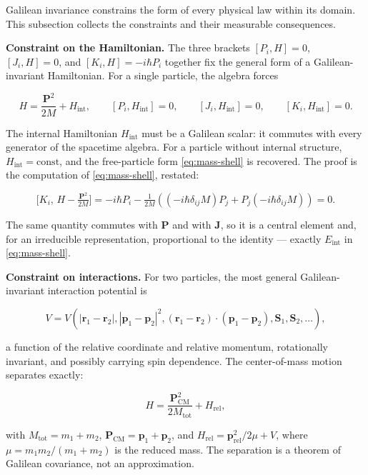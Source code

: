 Galilean invariance constrains the form of every physical law within its domain. This subsection collects the constraints and their measurable consequences.

\medskip\noindent\textbf{Constraint on the Hamiltonian.} The three brackets $[P_i,H]=0$, $[J_i,H]=0$, and $[K_i,H]=-i\hbar P_i$ together fix the general form of a Galilean-invariant Hamiltonian. For a single particle, the algebra forces
\begin{linenomath}
\begin{equation}
H = \frac{\bm P^{2}}{2M} + H_{\mathrm{int}},
\qquad
[P_i,H_{\mathrm{int}}] = 0,\qquad [J_i,H_{\mathrm{int}}] = 0,\qquad [K_i,H_{\mathrm{int}}] = 0.
\label{eq:constrained-hamiltonian}
\end{equation}
\end{linenomath}
The internal Hamiltonian $H_{\mathrm{int}}$ must be a Galilean scalar: it commutes with every generator of the spacetime algebra. For a particle without internal structure, $H_{\mathrm{int}} = \mathrm{const}$, and the free-particle form \eqref{eq:mass-shell} is recovered. The proof is the computation of \eqref{eq:mass-shell}, restated:
\begin{linenomath}
\begin{equation*}
\bigl[K_i,\,H - \tfrac{\bm P^{2}}{2M}\bigr] = -i\hbar P_i - \tfrac{1}{2M}((-i\hbar\delta_{ij}M)P_j + P_j(-i\hbar\delta_{ij}M)) = 0 .
\end{equation*}
\end{linenomath}
The same quantity commutes with $\bm P$ and with $\bm J$, so it is a central element and, for an irreducible representation, proportional to the identity --- exactly $E_{\mathrm{int}}$ in \eqref{eq:mass-shell}.

\medskip\noindent\textbf{Constraint on interactions.} For two particles, the most general Galilean-invariant interaction potential is
\begin{linenomath}
\begin{equation}
V = V(|\bm r_{1} - \bm r_{2}|, |\bm p_{1} - \bm p_{2}|^{2}, (\bm r_{1}-\bm r_{2})\!\cdot\!(\bm p_{1}-\bm p_{2}), \bm S_{1},\bm S_{2}, \ldots),
\label{eq:galilei-potential}
\end{equation}
\end{linenomath}
a function of the relative coordinate and relative momentum, rotationally invariant, and possibly carrying spin dependence. The center-of-mass motion separates exactly:
\begin{linenomath}
\begin{equation}
H = \frac{\bm P_{\mathrm{CM}}^{2}}{2M_{\mathrm{tot}}} + H_{\mathrm{rel}},
\label{eq:cm-separation}
\end{equation}
\end{linenomath}
with $M_{\mathrm{tot}} = m_{1}+m_{2}$, $\bm P_{\mathrm{CM}} = \bm p_{1}+\bm p_{2}$, and $H_{\mathrm{rel}} = \bm p_{\mathrm{rel}}^{2}/2\mu + V$, where $\mu = m_{1}m_{2}/(m_{1}+m_{2})$ is the reduced mass. The separation is a theorem of Galilean covariance, not an approximation.

